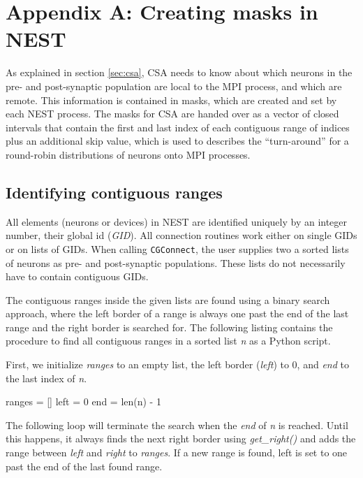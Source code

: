 \documentclass{frontiersSCNS} %
\begin{document}
\section*{Appendix A: Creating masks in NEST}\label{sec:creating_masks}

As explained in section \ref{sec:csa}, CSA needs to know about which
neurons in the pre- and post-synaptic population are local to the MPI
process, and which are remote. This information is contained in masks,
which are created and set by each NEST process. The masks for CSA are
handed over as a vector of closed intervals that contain the first and
last index of each contiguous range of indices plus an additional skip
value, which is used to describes the ``turn-around'' for a round-robin
distributions of neurons onto MPI processes.

\subsection*{Identifying contiguous ranges}

All elements (neurons or devices) in NEST are identified uniquely by
an integer number, their global id (\emph{GID}). All connection
routines work either on single GIDs or on lists of GIDs. When calling
\verb|CGConnect|, the user supplies two a sorted lists of neurons as
pre- and post-synaptic populations. These lists do not necessarily
have to contain contiguous GIDs.

The contiguous ranges inside the given lists are found using a binary
search approach, where the left border of a range is always one past
the end of the last range and the right border is searched for. The
following listing contains the procedure to find all contiguous ranges
in a sorted list \emph{n} as a Python script.

First, we initialize \emph{ranges} to an empty list, the left border
(\emph{left}) to 0, and \emph{end} to the last index of \emph{n}.

\begin{pythoncode}
ranges = []
left = 0
end = len(n) - 1
\end{pythoncode}

The following loop will terminate the search when the \emph{end} of
\emph{n} is reached. Until this happens, it always finds the next
right border using \emph{get\_right()} and adds the range between
\emph{left} and \emph{right} to \emph{ranges}. If a new range is
found, left is set to one past the end of the last found range.
\end{document}
